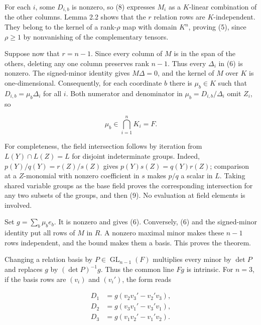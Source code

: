 \documentclass[11pt]{article}
\begin{document}
For each $i$, some $D_{i,b}$ is nonzero, so (8) expresses $M_i$ as a $K$-linear combination of the other columns. Lemma 2.2 shows that the $r$ relation rows are $K$-independent. They belong to the kernel of a rank-$\rho$ map with domain $K^n$, proving (5), since $\rho\geq1$ by nonvanishing of the complementary tensors.


Suppose now that $r=n-1$. Since every column of $M$ is in the span of the others, deleting any one column preserves rank $n-1$. Thus every $\Delta_i$ in (6) is nonzero. The signed-minor identity gives $M\Delta=0$, and the kernel of $M$ over $K$ is one-dimensional. Consequently, for each coordinate $b$ there is $\mu_b\in K$ such that $D_{i,b}=\mu_b\Delta_i$ for all $i$. Both numerator and denominator in $\mu_b=D_{i,b}/\Delta_i$ omit $Z_i$, so


\nopagebreak[4]

\begin{equation}
\mu_b\in\bigcap_{i=1}^n K_i=F.
\tag{9}
\end{equation}

For completeness, the field intersection follows by iteration from $L(Y)\cap L(Z)=L$ for disjoint indeterminate groups. Indeed, $p(Y)/q(Y)=r(Z)/s(Z)$ gives $p(Y)s(Z)=q(Y)r(Z)$; comparison at a $Z$-monomial with nonzero coefficient in $s$ makes $p/q$ a scalar in $L$. Taking shared variable groups as the base field proves the corresponding intersection for any two subsets of the groups, and then (9). No evaluation at field elements is involved.


Set $g=\sum_b\mu_be_b$. It is nonzero and gives (6). Conversely, (6) and the signed-minor identity put all rows of $M$ in $R$. A nonzero maximal minor makes these $n-1$ rows independent, and the bound makes them a basis. This proves the theorem.


Changing a relation basis by $P\in\operatorname{GL}_{n-1}(F)$ multiplies every minor by $\det P$ and replaces $g$ by $(\det P)^{-1}g$. Thus the common line $Fg$ is intrinsic. For $n=3$, if the basis rows are $(v_i)$ and $(v_i')$, the form reads


\nopagebreak[4]

\begin{equation}
\begin{aligned}
D_1&=g(v_2v_3'-v_2'v_3),\\
D_2&=g(v_3v_1'-v_3'v_1),\\
D_3&=g(v_1v_2'-v_1'v_2).
\end{aligned}
\tag{10}
\end{equation}
\end{document}
